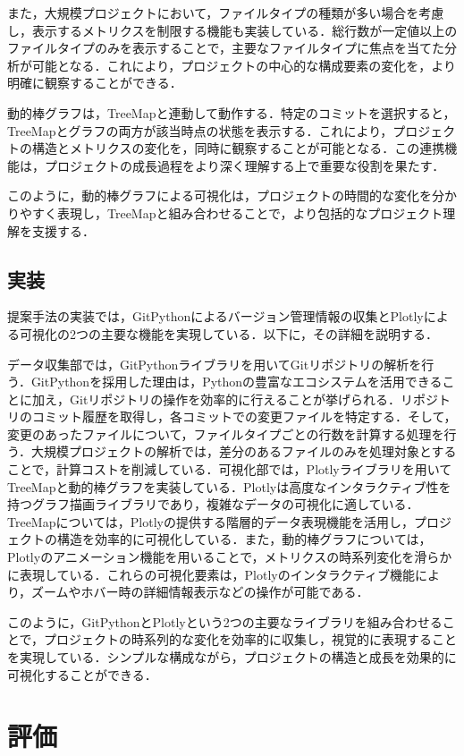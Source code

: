 \documentclass[12pt,twoside]{jbook}
\begin{document}
また，大規模プロジェクトにおいて，ファイルタイプの種類が多い場合を考慮し，表示するメトリクスを制限する機能も実装している．総行数が一定値以上のファイルタイプのみを表示することで，主要なファイルタイプに焦点を当てた分析が可能となる．これにより，プロジェクトの中心的な構成要素の変化を，より明確に観察することができる．

動的棒グラフは，TreeMapと連動して動作する．特定のコミットを選択すると，TreeMapとグラフの両方が該当時点の状態を表示する．これにより，プロジェクトの構造とメトリクスの変化を，同時に観察することが可能となる．この連携機能は，プロジェクトの成長過程をより深く理解する上で重要な役割を果たす．

このように，動的棒グラフによる可視化は，プロジェクトの時間的な変化を分かりやすく表現し，TreeMapと組み合わせることで，より包括的なプロジェクト理解を支援する．

\section{実装}
提案手法の実装では，GitPythonによるバージョン管理情報の収集とPlotlyによる可視化の2つの主要な機能を実現している．以下に，その詳細を説明する．

データ収集部では，GitPythonライブラリを用いてGitリポジトリの解析を行う．GitPythonを採用した理由は，Pythonの豊富なエコシステムを活用できることに加え，Gitリポジトリの操作を効率的に行えることが挙げられる．リポジトリのコミット履歴を取得し，各コミットでの変更ファイルを特定する．そして，変更のあったファイルについて，ファイルタイプごとの行数を計算する処理を行う．大規模プロジェクトの解析では，差分のあるファイルのみを処理対象とすることで，計算コストを削減している．可視化部では，Plotlyライブラリを用いてTreeMapと動的棒グラフを実装している．Plotlyは高度なインタラクティブ性を持つグラフ描画ライブラリであり，複雑なデータの可視化に適している．TreeMapについては，Plotlyの提供する階層的データ表現機能を活用し，プロジェクトの構造を効率的に可視化している．また，動的棒グラフについては，Plotlyのアニメーション機能を用いることで，メトリクスの時系列変化を滑らかに表現している．これらの可視化要素は，Plotlyのインタラクティブ機能により，ズームやホバー時の詳細情報表示などの操作が可能である．

このように，GitPythonとPlotlyという2つの主要なライブラリを組み合わせることで，プロジェクトの時系列的な変化を効率的に収集し，視覚的に表現することを実現している．シンプルな構成ながら，プロジェクトの構造と成長を効果的に可視化することができる．

\chapter{評価}
\end{document}
